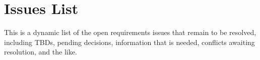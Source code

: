 \chapter{Issues List}

This is a dynamic list of the open requirements issues that remain to
be resolved, including TBDs, pending decisions, information that is
needed, conflicts awaiting resolution, and the like.
